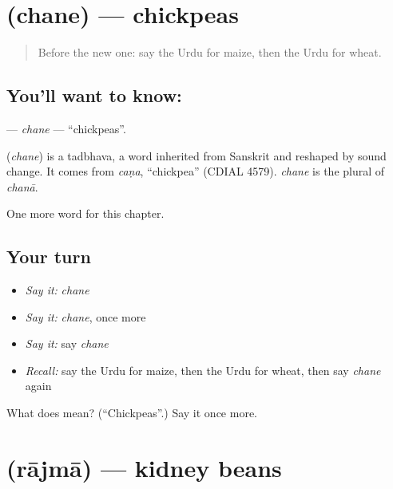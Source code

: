 \section[\texorpdfstring{\ur{چنے} (chane)}{چنے (chane)}]{ (chane) — chickpeas}

\label{lesson:UR-C174-chane}



\begin{quote}
Before the new one: say the Urdu for maize, then the Urdu for wheat.
\end{quote}

\subsection*{You'll want to know: }
\textbf{} — \emph{chane} — \textquotedblleft{}chickpeas\textquotedblright{}.

\begin{cousinweb}
\textbf{} (\emph{chane}) is a tadbhava, a word inherited from Sanskrit and reshaped by sound change. It comes from \emph{caṇa}, \textquotedblleft{}chickpea\textquotedblright{} (CDIAL 4579). \emph{chane} is the plural of \emph{chanā}.
\end{cousinweb}

\begin{grammarlens}[title={What you've built}]
One more word for this chapter.
\end{grammarlens}

\subsection*{Your turn}
\begin{itemize}
\raggedright
  \item \emph{Say it:} \emph{chane}
  \item \emph{Say it:} \emph{chane}, once more
  \item \emph{Say it:} say \emph{chane}
  \item \emph{Recall:} say the Urdu for maize, then the Urdu for wheat, then say \emph{chane} again
\end{itemize}

\begin{tcolorbox}[breakable,colback=teal!4,colframe=teal!35!black,title={Before you move on}]
What does  mean? (\textquotedblleft{}Chickpeas\textquotedblright{}.) Say it once more.
\end{tcolorbox}
\section[\texorpdfstring{\ur{راجما} (rājmā)}{راجما (rājmā)}]{ (rājmā) — kidney beans}


